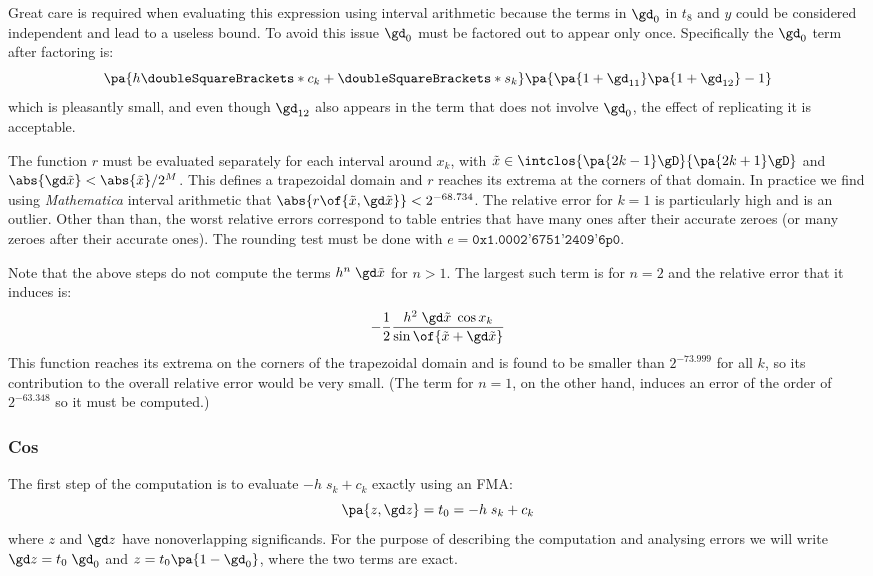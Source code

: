 \documentclass[10pt, a4paper, twoside]{basestyle}
\newcommand{\round}[1]{\doubleSquareBrackets*{#1}}
\newcommand{\red}[1]{\tilde{#1}}
\begin{document}
Great care is required when evaluating this expression using interval arithmetic because the terms in $\gd_0$ in $t_8$ and $y$ could be considered independent and lead to a useless bound.  To avoid this issue $\gd_0$ must be factored out to appear only once.  Specifically the $\gd_0$ term after factoring is:
\[
\pa{h \round{c_k} + \round{s_k}} \pa{\pa{1 + \gd_{11}} \pa{1 + \gd_{12}} - 1}
\]
which is pleasantly small, and even though $\gd_{12}$ also appears in the term that does not involve $\gd_0$, the effect of replicating it is acceptable.

The function $r$ must be evaluated separately for each interval around $x_k$, with $\red x \in \intclos{\pa{2 k - 1}\gD}{\pa{2 k + 1}\gD}$ and $\abs{\gd \red x} < {\abs{\red x}} / 2^M$.  This defines a trapezoidal domain and $r$ reaches its extrema at the corners of that domain.  In practice we find using \textit{Mathematica} interval arithmetic that $\abs{r\of{\red x, \gd \red x}} < 2^{-68.734}$.  The relative error for $k = 1$ is particularly high and is an outlier.  Other than than, the worst relative errors correspond to table entries that have many ones after their accurate zeroes (or many zeroes after their accurate ones).  The rounding test must be done with $e = \texttt{0x1.0002'6751'2409'6p0}$.

Note that the above steps do not compute the terms $h^n \; \gd \red x$ for $n > 1$.  The largest such term is for $n = 2$ and the relative error that it induces is:
\[
-\frac{1}{2}\frac{h^2 \; \gd \red x \; \cos x_k}{\sin\of{\red x + \gd \red x}}
\]
This function reaches its extrema on the corners of the trapezoidal domain and is found to be smaller than $2^{-73.999}$ for all $k$, so its contribution to the overall relative error would be very small.  (The term for $n = 1$, on the other hand, induces an error of the order of $2^{-63.348}$ so it must be computed.)

\subsubsection*{Cos}\label{secerroranalysiscos}

The first step of the computation is to evaluate $-h \; s_k + c_k$ exactly using an FMA:
\[
\pa{z, \gd z} = t_0 = -h \; s_k + c_k
\]
where $z$ and $\gd z$ have nonoverlapping significands.  For the purpose of describing the computation and analysing errors we will write $\gd z = t_0 \; \gd_0$ and $z = t_0 \pa{1 - \gd_0}$, where the two terms are exact.
\end{document}
